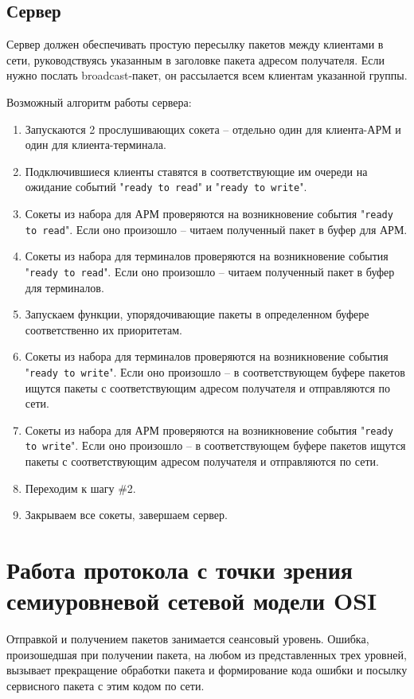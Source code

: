 \documentclass[a4paper,12pt]{report}
\begin{document}
\subsection*{Сервер}
Сервер должен обеспечивать простую пересылку пакетов между клиентами в сети, руководствуясь указанным в заголовке 
пакета адресом получателя. Если нужно послать broadcast-пакет, он рассылается всем клиентам указанной группы.

Возможный алгоритм работы сервера:
\begin{enumerate}
\item Запускаются 2 прослушивающих сокета -- отдельно один для клиента-АРМ и один для клиента-терминала.
\item Подключившиеся клиенты ставятся в соответствующие им очереди на ожидание событий "\texttt{ready to read}" и 
"\texttt{ready to write}".
\item Сокеты из набора для АРМ проверяются на возникновение события "\texttt{ready to read}". Если оно произошло -- 
читаем полученный пакет в буфер для АРМ.
\item Сокеты из набора для терминалов проверяются на возникновение события "\texttt{ready to read}". Если оно произошло -- 
читаем полученный пакет в буфер для терминалов.
\item Запускаем функции, упорядочивающие пакеты в определенном буфере соответственно их приоритетам.
\item Сокеты из набора для терминалов проверяются на возникновение события "\texttt{ready to write}". Если оно произошло -- 
в соответствующем буфере пакетов ищутся пакеты с соответствующим адресом получателя и отправляются по сети.
\item Сокеты из набора для АРМ проверяются на возникновение события "\texttt{ready to write}". Если оно произошло -- 
в соответствующем буфере пакетов ищутся пакеты с соответствующим адресом получателя и отправляются по сети.
\item Переходим к шагу \#2.
\item Закрываем все сокеты, завершаем сервер.
\end{enumerate}


\section*{Работа протокола с точки зрения семиуровневой сетевой модели OSI}
Отправкой и получением пакетов занимается сеансовый уровень. Ошибка, произошедшая при получении пакета, на любом из 
представленных трех уровней, вызывает прекращение обработки пакета и формирование кода ошибки и посылку сервисного 
пакета с этим кодом по сети.
\end{document}
